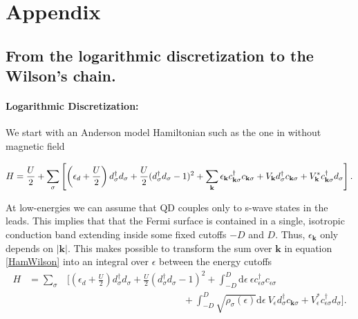 \chapter{Appendix}

\section{From the logarithmic discretization to the Wilson's chain.\label{sec:LogarithmicDisc}}

\subsubsection{Logarithmic Discretization:}

We start with an Anderson model Hamiltonian such as the one 
in  without magnetic field

\begin{equation}
H=\frac{U}{2}+\sum_{\sigma}\left[\left(\epsilon_{d}+\frac{U}{2}\right)d_{\sigma}^{\dagger}d_{\sigma}+\frac{U}{2}(d_{\sigma}^{\dagger}d_{\sigma}-1)^{2}+\sum_{\mathbf{k}}\epsilon_{\mathbf{k}}c_{\mathbf{k}\sigma}^{\dagger}c_{\mathbf{k}\sigma}+V_{\mathbf{k}}d_{\sigma}^{\dagger}c_{\mathbf{k}\sigma}+V_{\mathbf{k}}^{*}c_{\mathbf{k}\sigma}^{\dagger}d_{\sigma}\right].\label{HamWilson}
\end{equation}

At low-energies we can assume that QD couples only to s-wave states in the leads\citep{krishna-murthy_renormalization-group_1980}. This implies that that the Fermi surface is contained
in a single, isotropic conduction band extending inside some fixed cutoffs $-D$ and $D$. Thus, $\epsilon_{\mathbf{k}}$ only depends on $\left|\mathbf{k}\right|$. This makes possible to transform the sum over $\mathbf{k}$ in
equation \ref{HamWilson} into an integral over $\epsilon$ between
the energy cutoffs
\begin{eqnarray}
H & =\sum_{\sigma} & \Biggl[\left(\epsilon_{d}+\frac{U}{2}\right)d_{\sigma}^{\dagger}d_{\sigma}+\frac{U}{2}(d_{\sigma}^{\dagger}d_{\sigma}-1)^{2}+\int_{-D}^{D}\mbox{d}\epsilon\ \epsilon c_{\epsilon\sigma}^{\dagger}c_{\epsilon\sigma}\nonumber \\
 &  & \qquad\qquad\qquad\qquad\qquad\qquad+\int_{-D}^{D}\sqrt{\rho_{\sigma}(\epsilon)}\mbox{d}\epsilon\ V_{\epsilon}d_{\sigma}^{\dagger}c_{\mathbf{k}\sigma}+V_{\epsilon}^{*}c_{\epsilon\sigma}^{\dagger}d_{\sigma}\Biggr].\label{eq:hamEnergy}
\end{eqnarray}


